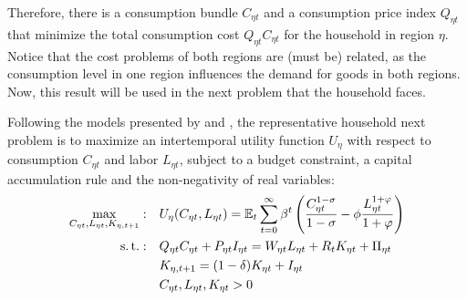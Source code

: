 \documentclass[../thesis.tex]{subfiles}
\begin{document}

	Therefore, there is a consumption bundle \(C_{\eta t}\) and a consumption price index \(Q_{\eta t}\) that minimize the total consumption cost \(Q_{\eta t} C_{\eta t}\) for the household in region \(\eta\). Notice that the cost problems of both regions are (must be) related, as the consumption level in one region influences the demand for goods in both regions. Now, this result will be used in the next problem that the household faces.


	Following the models presented by \textcite{costa_junior_understanding_2016} and \textcite{solis-garcia_ucb_2022}, the representative household next problem is to maximize an intertemporal utility function $U_{\eta}$ with respect to consumption $C_{\eta t}$ and labor $L_{\eta t}$, subject to a budget constraint, a capital accumulation rule and the non-negativity of real variables:
	\begin{align}
		\max_{C_{\eta t}, L_{\eta t}, K_{\eta,t+1}}: &\quad U_{\eta}(C_{\eta t},L_{\eta t}) = {\mathbb{E}_{t}} \sum_{t=0}^{\infty} \beta^t \left(\frac{C_{\eta t}^{1-\sigma}}{1-\sigma} - \phi \frac{L_{\eta t}^{1+\varphi}}{1+\varphi} \right) \label{eq_v2:reg-utility-function} 
		\\
		\operatorname{s.t.}: &\quad Q_{\eta t} C_{\eta t} + P_{\eta t} I_{\eta t} = W_{\eta t} L_{\eta t} + R_{t} K_{\eta t} + \Pi_{\eta t} \label{eq_v2:reg-budget-constraint} \\
		&\quad K_{\eta,t+1} = (1 - \delta) K_{\eta t} + I_{\eta t} \label{eq_v2:reg-law-of-motion-of-capital} \\
		&\quad C_{\eta t}, L_{\eta t}, K_{\eta t} > 0 \nonumber
	\end{align}
\end{document}
